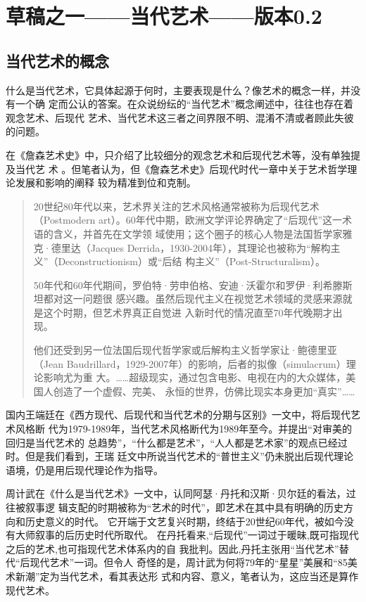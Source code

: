 \chapter{草稿之一——当代艺术——版本0.2}

\section{当代艺术的概念}

什么是当代艺术，它具体起源于何时，主要表现是什么？像艺术的概念一样，并没有一个确
定而公认的答案。在众说纷纭的“当代艺术”概念阐述中，往往也存在着观念艺术、后现代
艺术、当代艺术这三者之间界限不明、混淆不清或者顾此失彼的问题。

在《詹森艺术史》中，只介绍了比较细分的观念艺术和后现代艺术等，没有单独提及当代艺
术 。但笔者认为，但《詹森艺术史》后现代时代一章中关于艺术哲学理论发展和影响的阐释
较为精准到位和克制。

\begin{quotation}
  20世纪80年代以来，艺术界关注的艺术风格通常被称为后现代艺术（Postmodern
  art）。60年代中期，欧洲文学评论界确定了“后现代”这一术语的含义，并首先在文学领
  域使用；这个圈子的核心人物是法国哲学家雅克·德里达（Jacques
  Derrida，1930-2004年），其理论也被称为“解构主义”（Deconstructionism）或“后结
  构主义”（Post-Structuralism）。\medskip

  50年代和60年代期间，罗伯特·劳申伯格、安迪·沃霍尔和罗伊·利希滕斯坦都对这一问题很
  感兴趣。虽然后现代主义在视觉艺术领域的灵感来源就是这个时期，但艺术界真正自觉进
  入新时代的情况直至70年代晚期才出现。\medskip

  他们还受到另一位法国后现代哲学家或后解构主义哲学家让·鲍德里亚（Jean
  Baudrillard，1929-2007年）的影响，后者的拟像（simulacrum）理论影响尤为重
  大。……超级现实，通过包含电影、电视在内的大众媒体，美国人创造了一个虚假、完美、
  永恒的世界，仿佛比现实本身更加“真实”……
\end{quotation}

国内王端廷在《西方现代、后现代和当代艺术的分期与区别》一文中，将后现代艺术风格断
代为1979-1989年，当代艺术风格断代为1989年至今。并提出“对审美的回归是当代艺术的
总趋势”，“什么都是艺术”，“人人都是艺术家”的观点已经过时。但是我们看到，王瑞
廷文中所说当代艺术的“普世主义”仍未脱出后现代理论语境，仍是用后现代理论作为指导。
\cite{wangduanting}

周计武在《什么是当代艺术》一文中，认同阿瑟·丹托和汉斯·贝尔廷的看法，过往被叙事逻
辑支配的时期被称为“艺术的时代”，即艺术在其中具有明确的历史方向和历史意义的时代。
它开端于文艺复兴时期，终结于20世纪60年代，被如今没有大师叙事的后历史时代所取代。
在丹托看来,“后现代”一词过于暖昧,既可指现代之后的艺术,也可指现代艺术体系内的自
我批判。因此,丹托主张用“当代艺术”替代“后现代艺术”一词。\cite{whatsart}但令人
奇怪的是，周计武为何将79年的“星星”美展和“85美术新潮”定为当代艺术，看其表达形
式和内容、意义，笔者认为，这应当还是算作现代艺术。

